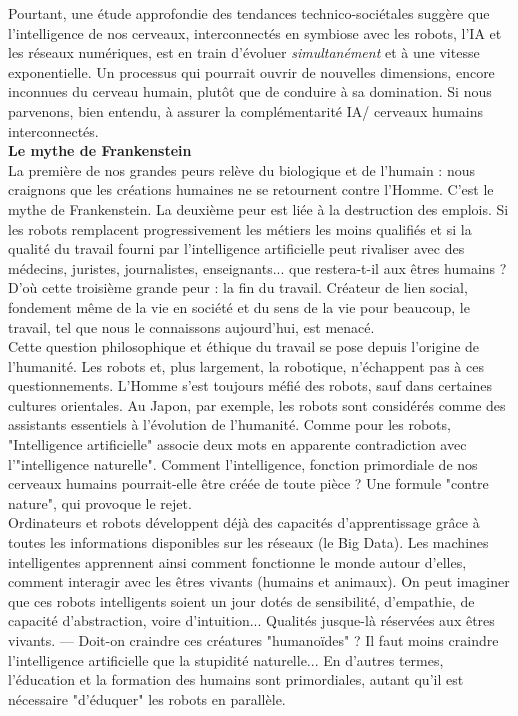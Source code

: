 \documentclass[11pt,twoside,a4paper]{article}
\begin{document}
Pourtant, une {\'e}tude approfondie des tendances technico-soci{\'e}tales sugg{\`e}re que l'intelligence de nos cerveaux, interconnect{\'e}s en symbiose avec les robots, l'IA et les r{\'e}seaux num{\'e}riques, est en train d'{\'e}voluer \emph{simultan{\'e}ment} et {\`a} une vitesse exponentielle. Un processus qui pourrait ouvrir de nouvelles dimensions, encore inconnues du cerveau humain, plut{\^o}t que de conduire {\`a} sa domination. Si nous parvenons, bien entendu, {\`a} assurer la compl{\'e}mentarit{\'e} IA/ cerveaux humains interconnect{\'e}s. ~\\

\textbf{Le mythe de Frankenstein}~\\

La premi{\`e}re de nos grandes peurs rel{\`e}ve du biologique et de l'humain : nous craignons que les cr{\'e}ations humaines ne se retournent contre l'Homme. C'est le mythe de Frankenstein. La deuxi{\`e}me peur est li{\'e}e {\`a} la destruction des emplois. Si les robots remplacent progressivement les m{\'e}tiers les moins qualifi{\'e}s et si la qualit{\'e} du travail fourni par l'intelligence artificielle peut rivaliser avec des m{\'e}decins, juristes, journalistes, enseignants... que restera-t-il aux {\^e}tres humains ? D'o{\`u} cette troisi{\`e}me grande peur : la fin du travail. Cr{\'e}ateur de lien social, fondement m{\^e}me de la vie en soci{\'e}t{\'e} et du sens de la vie pour beaucoup, le travail, tel que nous le connaissons aujourd'hui, est menac{\'e}. ~\\

Cette question philosophique et {\'e}thique du travail se pose depuis l'origine de l'humanit{\'e}. Les robots et, plus largement, la robotique, n'{\'e}chappent pas {\`a} ces questionnements. L'Homme s'est toujours m{\'e}fi{\'e} des robots, sauf dans certaines cultures orientales. Au Japon, par exemple, les robots sont consid{\'e}r{\'e}s comme des assistants essentiels {\`a} l'{\'e}volution de l'humanit{\'e}. Comme pour les robots, "Intelligence artificielle" associe deux mots en apparente contradiction avec l'"intelligence naturelle". Comment l'intelligence, fonction primordiale de nos cerveaux humains pourrait-elle {\^e}tre cr{\'e}{\'e}e de toute pi{\`e}ce ? Une formule "contre nature", qui provoque le rejet. ~\\

Ordinateurs et robots d{\'e}veloppent d{\'e}j{\`a} des capacit{\'e}s d'apprentissage gr{\^a}ce {\`a} toutes les informations disponibles sur les r{\'e}seaux (le Big Data). Les machines intelligentes apprennent ainsi comment fonctionne le monde autour d'elles, comment interagir avec les {\^e}tres vivants (humains et animaux). On peut imaginer que ces robots intelligents soient un jour dot{\'e}s de sensibilit{\'e}, d'empathie, de capacit{\'e} d'abstraction, voire d'intuition... Qualit{\'e}s jusque-l{\`a} r{\'e}serv{\'e}es aux {\^e}tres vivants. --- Doit-on craindre ces cr{\'e}atures "humano{\"i}des" ? Il faut moins craindre l'intelligence artificielle que la stupidit{\'e} naturelle... En d'autres termes, l'{\'e}ducation et la formation des humains sont primordiales, autant qu'il est n{\'e}cessaire "d'{\'e}duquer" les robots en parall{\`e}le. ~\\
\end{document}
